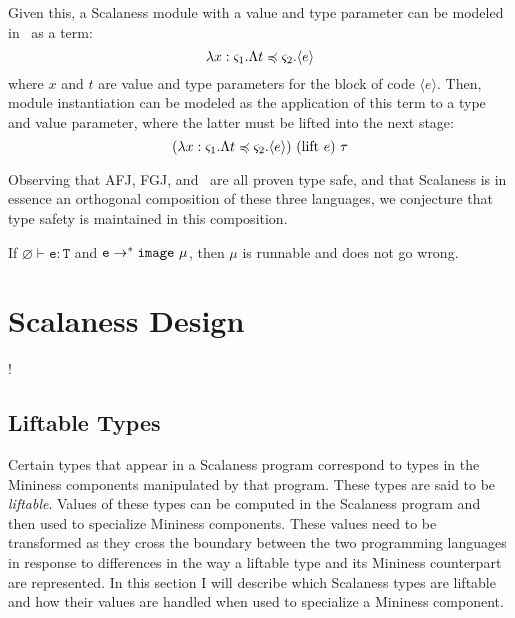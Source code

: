 Given this, a Scalaness module with a value and type parameter can be
modeled in \fml\ as a term: 
$$\lambda x : \varsigma_1 . \Lambda t \preccurlyeq \varsigma_2 . \langle e \rangle$$
where $x$ and $t$ are value and type parameters for the block of code
$\langle e \rangle$.  Then, module instantiation can be modeled as the
application of this term to a type and value parameter, where the
latter must be lifted into the next stage:
$$
(\lambda x : \s_1 . \Lambda t \subtype \s_2 . \langle e \rangle)\ (\mathrm{lift}\ e)\ \t
$$ 

Observing that AFJ, FGJ, and \fml\ are all proven type safe, and that
Scalaness is in essence an orthogonal composition of these three
languages, we conjecture that type safety is maintained in this
composition. 

\begin{conject}
If $\varnothing \vdash \texttt{e} : \texttt{T}$ and $\texttt{e} \rightarrow^*
\mathtt{image}\ \mu$, then $\mu$ is runnable and does not go wrong.
\end{conject}


\section{Scalaness Design}
\label{section-scalaness-design}

\lstset{language=scalaness}
\lstMakeShortInline!

\subsection{Liftable Types}
\label{section-liftable-types-design}

Certain types that appear in a Scalaness program correspond to types in the Mininess components
manipulated by that program. These types are said to be \textit{liftable}. Values of these types
can be computed in the Scalaness program and then used to specialize Mininess components. These
values need to be transformed as they cross the boundary between the two programming languages
in response to differences in the way a liftable type and its Mininess counterpart are
represented. In this section I will describe which Scalaness types are liftable and how their
values are handled when used to specialize a Mininess component.

